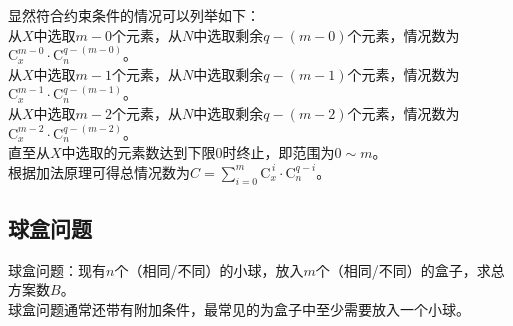 \documentclass[UTF8]{ctexart}
\newcommand{\Co}{\mathrm{C}}
\begin{document}
    显然符合约束条件的情况可以列举如下：\\[3mm]
    从$X$中选取$m-0$个元素，从$N$中选取剩余$q-(m-0)$个元素，情况数为$\Co_{x}^{m-0}\cdot\Co_{n}^{q-(m-0)}$。\\[3mm]
    从$X$中选取$m-1$个元素，从$N$中选取剩余$q-(m-1)$个元素，情况数为$\Co_{x}^{m-1}\cdot\Co_{n}^{q-(m-1)}$。\\[3mm]
    从$X$中选取$m-2$个元素，从$N$中选取剩余$q-(m-2)$个元素，情况数为$\Co_{x}^{m-2}\cdot\Co_{n}^{q-(m-2)}$。\\[3mm]
    直至从$X$中选取的元素数达到下限$0$时终止，即范围为$0\sim m$。\\[3mm]
    根据加法原理可得总情况数为$C=\sum_{i=0}^{m}\Co_{x}^{\,i}\cdot\Co_{n}^{q-i}$。


\newpage

\subsection{球盒问题}
    球盒问题：现有$n$个（相同/不同）的小球，放入$m$个（相同/不同）的盒子，求总方案数$B$。\\[3mm]
    球盒问题通常还带有附加条件，最常见的为盒子中至少需要放入一个小球。
\end{document}
